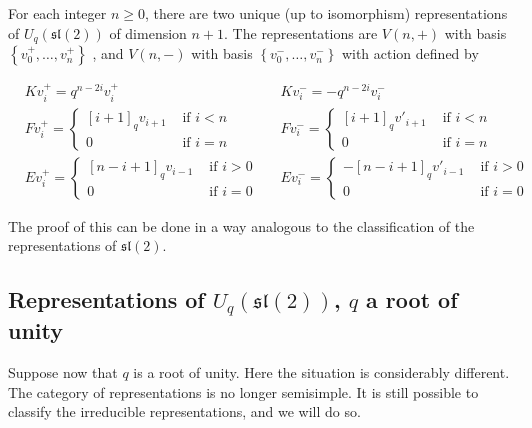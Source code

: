 \documentclass[]{article}
\newcommand{\sll}{\mathfrak{sl}}
\numberwithin{equation}{subsection}
\begin{document}
For each integer $n \geq 0$, there are two unique (up to isomorphism)
representations of $U_q(\sll(2))$ of dimension $n+1$. 
The representations are $V(n,+)$ with basis $\left\{ v^+_0, \ldots, v^+_n \right\}$ , and $V(n,-)$ with basis $\left\{ v^-_0, \ldots, v^-_n \right\}$ with action defined by 

\begin{align*}
    &K v^+_i = q^{n-2i} v^+_i  &
    &K v^-_i = -q^{n-2i} v^-_i \\
    &F v^+_i = \begin{cases} [i+1]_qv_{i+1}& \text{ if $i < n$} \\ 0& \text{ if $i = n$} \end{cases} &
    &F v^-_i = \begin{cases} [i+1]_qv'_{i+1}& \text{ if $i < n$} \\ 0& \text{ if $i = n$} \end{cases} \\
    &E v^+_i = \begin{cases} 
                     [n-i+1]_qv_{i-1}& \text{ if $i > 0$} \\ 
                    0& \text{ if $i = 0$} 
             \end{cases} &
    &E v^-_i = \begin{cases} 
                    -[n-i+1]_q v'_{i-1}& \text{ if $i > 0$} \\ 
                    0& \text{ if $i = 0$} 
             \end{cases}
\end{align*}

The proof of this can be done in a way analogous to the classification of the representations of $\sll(2)$.

\subsection{Representations of $U_q(\sll(2))$, $q$ a root of unity}



Suppose now that $q$ is a root of unity. Here the situation is considerably
different. The category of representations is no longer semisimple. It is
still possible to classify the irreducible representations, and we will do so. 
\end{document}
